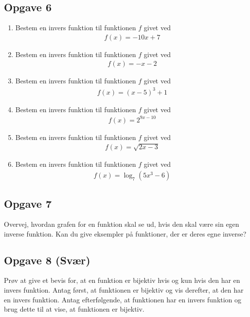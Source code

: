 \subsection*{Opgave 6}
\begin{enumerate}[label=\roman*)]
	\item Bestem en invers funktion til funktionen $f$ givet ved
	\begin{align*}
		f(x) = -10x + 7
	\end{align*}
	\item Bestem en invers funktion til funktionen $f$ givet ved
	\begin{align*}
		f(x) = -x-2
	\end{align*}
	\item Bestem en invers funktion til funktionen $f$ givet ved
	\begin{align*}
		f(x) = (x-5)^3 + 1
	\end{align*}
	\item Bestem en invers funktion til funktionen $f$ givet ved
	\begin{align*}
		f(x) = 2^{9x-10}
	\end{align*}
	\item Bestem en invers funktion til funktionen $f$ givet ved
	\begin{align*}
		f(x) = \sqrt{2x -3}
	\end{align*}
	\item Bestem en invers funktion til funktionen $f$ givet ved
	\begin{align*}
		f(x) = \log_7(5x^3-6)
	\end{align*}
\end{enumerate}

\subsection*{Opgave 7}
Overvej, hvordan grafen for en funktion skal se ud, hvis den skal være sin egen inverse funktion. Kan du give eksempler på funktioner, der er deres egne inverse?

\subsection*{Opgave 8 (Svær)}
Prøv at give et bevis for, at en funktion er bijektiv hvis og kun hvis den har en invers funktion. Antag først, at funktionen er bijektiv og vis derefter, at den har en invers funktion. Antag efterfølgende, at funktionen har en invers funktion og brug dette til at vise, at funktionen er bijektiv. 


